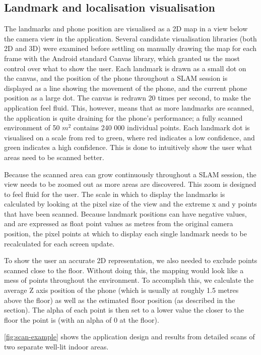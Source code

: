 \documentclass{article}
\begin{document}
\subsection{Landmark and localisation visualisation} \label{landmark-visualisation}
The landmarks and phone position are visualised as a 2D map in a view below the camera view in the application. Several candidate visualisation libraries (both 2D and 3D) were examined before settling on manually drawing the map for each frame with the Android standard Canvas library, which granted us the most control over what to show the user. Each landmark is drawn as a small dot on the canvas, and the position of the phone throughout a SLAM session is displayed as a line showing the movement of the phone, and the current phone position as a large dot. The canvas is redrawn 20 times per second, to make the application feel fluid. This, however, means that as more landmarks are scanned, the application is quite draining for the phone's performance; a fully scanned environment of 50 $m^2$ contains 240 000 individual points. Each landmark dot is visualised on a scale from red to green, where red indicates a low confidence, and green indicates a high confidence. This is done to intuitively show the user what areas need to be scanned better.

Because the scanned area can grow continuously throughout a SLAM session, the view needs to be zoomed out as more areas are discovered. This zoom is designed to feel fluid for the user. The scale in which to display the landmarks is calculated by looking at the pixel size of the view and the extreme x and y points that have been scanned. Because landmark positions can have negative values, and are expressed as float point values as metres from the original camera position, the pixel points at which to display each single landmark needs to be recalculated for each screen update.

To show the user an accurate 2D representation, we also needed to exclude points scanned close to the floor. Without doing this, the mapping would look like a mess of points throughout the environment. To accomplish this, we calculate the average Z axis position of the phone (which is usually at roughly 1.5 metres above the floor) as well as the estimated floor position (as described in the  section). The alpha of each point is then set to a lower value the closer to the floor the point is (with an alpha of 0 at the floor).

\autoref{fig:scan-example} shows the application design and results from detailed scans of two separate well-lit indoor areas.
\end{document}
